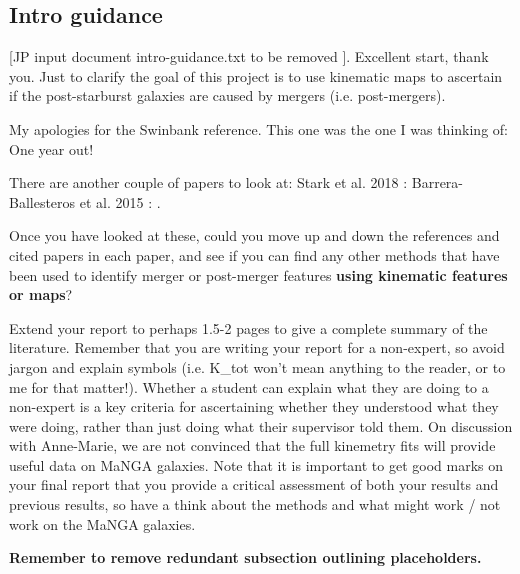 \subsection{Intro guidance}
[JP input document intro-guidance.txt to be removed ]. Excellent start, thank you. Just to clarify the goal of this project is to use kinematic maps to ascertain if the post-starburst galaxies are caused by mergers (i.e. post-mergers). 

My apologies for the Swinbank reference. This one was the one I was thinking of: \citet{2012MNRAS.420..672S} One year out!
 
There are another couple of papers to look at:
Stark et al. 2018 : \citep{2018MNRAS.480.2217S} 
Barrera-Ballesteros et al. 2015 : \citet{2015A&A...582A..21B}.
 
Once you have looked at these, could you move up and down the references and cited papers in each paper, and see if you can find any other methods that have been used to identify merger or post-merger features \textbf{using kinematic features or maps}?
 
Extend your report to perhaps 1.5-2 pages to give a complete summary of the literature.
Remember that you are writing your report for a non-expert, so avoid jargon and explain symbols (i.e. K\_tot won't mean anything to the reader, or to me for that matter!). Whether a student can explain what they are doing to a non-expert is a key criteria for ascertaining whether they understood what they were doing, rather than just doing what their supervisor told them.  On discussion with Anne-Marie, we are not convinced that the full kinemetry fits will provide useful data on MaNGA galaxies. Note that it is important to get good marks on your final report that you provide a critical assessment of both your results and previous results, so have a think about the methods and what might work / not work on the MaNGA galaxies. 

\vspace{6pt}
\textbf{Remember to remove redundant subsection outlining placeholders.}